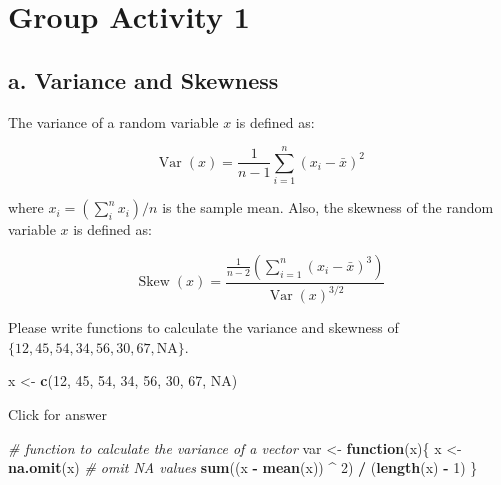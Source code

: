 \documentclass[
]{book}
\newenvironment{Shaded}{\begin{snugshade}}{\end{snugshade}}
\newcommand{\CommentTok}[1]{\textcolor[rgb]{0.56,0.35,0.01}{\textit{#1}}}
\newcommand{\ConstantTok}[1]{\textcolor[rgb]{0.56,0.35,0.01}{#1}}
\newcommand{\ControlFlowTok}[1]{\textcolor[rgb]{0.13,0.29,0.53}{\textbf{#1}}}
\newcommand{\DecValTok}[1]{\textcolor[rgb]{0.00,0.00,0.81}{#1}}
\newcommand{\FunctionTok}[1]{\textcolor[rgb]{0.13,0.29,0.53}{\textbf{#1}}}
\newcommand{\NormalTok}[1]{#1}
\newcommand{\OtherTok}[1]{\textcolor[rgb]{0.56,0.35,0.01}{#1}}
\newcommand{\SpecialCharTok}[1]{\textcolor[rgb]{0.81,0.36,0.00}{\textbf{#1}}}
\begin{document}
\hypertarget{group-activity-1-1}{%
\section{Group Activity 1}\label{group-activity-1-1}}

\hypertarget{a.-variance-and-skewness}{%
\subsection{a. Variance and Skewness}\label{a.-variance-and-skewness}}

The variance of a random variable \(x\) is defined as:

\[\operatorname{Var}(x)=\frac{1}{n-1} \sum_{i=1}^{n}\left(x_{i}-\bar{x}\right)^{2}\]

where \(x_i = (\sum_i^n x_i)/n\) is the sample mean. Also, the skewness of the random variable \(x\) is defined as:

\[\operatorname{Skew}(x)=\frac{\frac{1}{n-2}\left(\sum_{i=1}^{n}\left(x_{i}-\bar{x}\right)^{3}\right)}{\operatorname{Var}(x)^{3 /2}}\]

Please write functions to calculate the variance and skewness of \(\{12, 45, 54, 34, 56, 30, 67, \text{NA}\}\).

\begin{Shaded}
\begin{Highlighting}[]
\NormalTok{x }\OtherTok{\textless{}{-}} \FunctionTok{c}\NormalTok{(}\DecValTok{12}\NormalTok{, }\DecValTok{45}\NormalTok{, }\DecValTok{54}\NormalTok{, }\DecValTok{34}\NormalTok{, }\DecValTok{56}\NormalTok{, }\DecValTok{30}\NormalTok{, }\DecValTok{67}\NormalTok{, }\ConstantTok{NA}\NormalTok{)}
\end{Highlighting}
\end{Shaded}

Click for answer

\begin{Shaded}
\begin{Highlighting}[]
\CommentTok{\# function to calculate the variance of a vector}
\NormalTok{var }\OtherTok{\textless{}{-}} \ControlFlowTok{function}\NormalTok{(x)\{}
\NormalTok{  x }\OtherTok{\textless{}{-}} \FunctionTok{na.omit}\NormalTok{(x) }\CommentTok{\# omit NA values}
  \FunctionTok{sum}\NormalTok{((x }\SpecialCharTok{{-}} \FunctionTok{mean}\NormalTok{(x)) }\SpecialCharTok{\^{}} \DecValTok{2}\NormalTok{) }\SpecialCharTok{/}\NormalTok{ (}\FunctionTok{length}\NormalTok{(x) }\SpecialCharTok{{-}} \DecValTok{1}\NormalTok{)}
\NormalTok{\}}
\end{Highlighting}
\end{Shaded}
\end{document}
